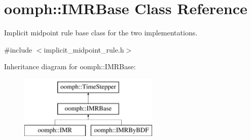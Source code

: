 \hypertarget{classoomph_1_1IMRBase}{}\section{oomph\+:\+:I\+M\+R\+Base Class Reference}
\label{classoomph_1_1IMRBase}


Implicit midpoint rule base class for the two implementations.  




{\ttfamily \#include $<$implicit\+\_\+midpoint\+\_\+rule.\+h$>$}

Inheritance diagram for oomph\+:\+:I\+M\+R\+Base\+:\begin{figure}[H]
\begin{center}
\leavevmode
\includegraphics[height=3.000000cm]{classoomph_1_1IMRBase}
\end{center}
\end{figure}
